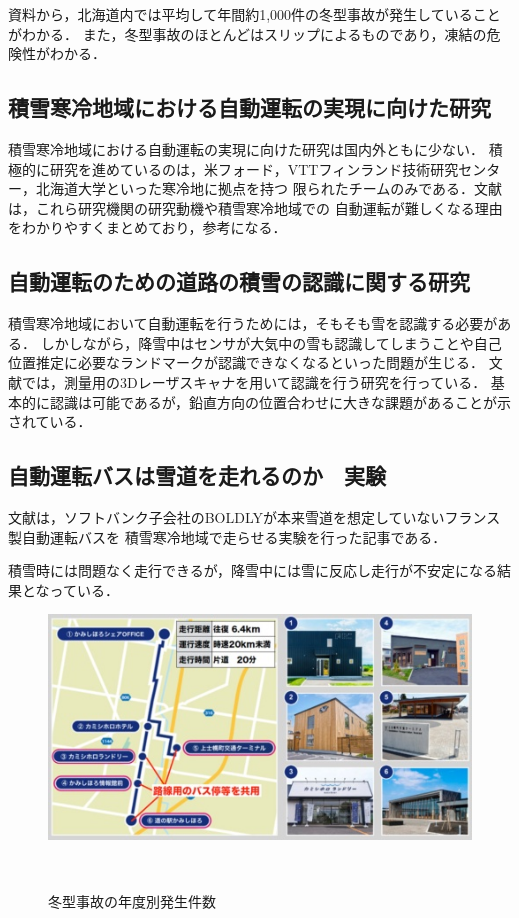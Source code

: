 \documentclass[a4paper]{jarticle}
\begin{document}
資料から，北海道内では平均して年間約1,000件の冬型事故が発生していることがわかる．
また，冬型事故のほとんどはスリップによるものであり，凍結の危険性がわかる．

\subsection{積雪寒冷地域における自動運転の実現に向けた研究}
積雪寒冷地域における自動運転の実現に向けた研究は国内外ともに少ない．
積極的に研究を進めているのは，米フォード，VTTフィンランド技術研究センター，北海道大学といった寒冷地に拠点を持つ
限られたチームのみである．文献\cite{cobby:online}は，これら研究機関の研究動機や積雪寒冷地域での
自動運転が難しくなる理由をわかりやすくまとめており，参考になる．

\subsection{自動運転のための道路の積雪の認識に関する研究}
積雪寒冷地域において自動運転を行うためには，そもそも雪を認識する必要がある．
しかしながら，降雪中はセンサが大気中の雪も認識してしまうことや自己位置推定に必要なランドマークが認識できなくなるといった問題が生じる．
文献\cite{ja83:online}では，測量用の3Dレーザスキャナを用いて認識を行う研究を行っている．
基本的に認識は可能であるが，鉛直方向の位置合わせに大きな課題があることが示されている．

\subsection{自動運転バスは雪道を走れるのか　実験}
文献\cite{bass:online}は，ソフトバンク子会社のBOLDLYが本来雪道を想定していないフランス製自動運転バスを
積雪寒冷地域で走らせる実験を行った記事である．

積雪時には問題なく走行できるが，降雪中には雪に反応し走行が不安定になる結果となっている．

\begin{figure}[H]
  \centering
  \includegraphics[width=0.6\linewidth]{picture/02.jpg}
  \caption{冬型事故の年度別発生件数}　
  \label{02}
\end{figure}
\end{document}
